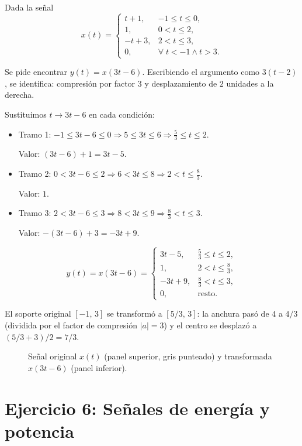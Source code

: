 \documentclass[10pt,a4paper]{article}
\begin{document}
	Dada la señal
	\[
	x(t)=
	\begin{cases}
	t+1, & -1\leq t\leq 0, \\
	1, & 0<t\leq 2, \\
	-t+3, & 2<t\leq 3, \\
	0, & \forall\; t<-1 \wedge t>3.
	\end{cases}
	\]
	
	Se pide encontrar $y(t) = x(3t-6)$. Escribiendo el argumento como $3(t-2)$, se identifica: compresión por factor $3$ y desplazamiento de $2$ unidades a la derecha.
	
	Sustituimos $t \to 3t-6$ en cada condición:
	\begin{itemize}
	    \item Tramo 1: $-1\leq 3t-6\leq 0 \Rightarrow 5\leq 3t\leq 6 \Rightarrow \frac{5}{3}\leq t\leq 2$.
	    
	    Valor: $(3t-6)+1 = 3t-5$.
	    \item Tramo 2: $0<3t-6\leq 2 \Rightarrow 6<3t\leq 8 \Rightarrow 2<t\leq \frac{8}{3}$.
	    
	    Valor: $1$.
	    \item Tramo 3: $2<3t-6\leq 3 \Rightarrow 8<3t\leq 9 \Rightarrow \frac{8}{3}<t\leq 3$.
	    
	    Valor: $-(3t-6)+3 = -3t+9$.
	\end{itemize}
	
	\[
	y(t) = x(3t-6) =
	\begin{cases}
	3t-5, & \frac{5}{3}\leq t\leq 2, \\[4pt]
	1, & 2<t\leq \frac{8}{3}, \\[4pt]
	-3t+9, & \frac{8}{3}<t\leq 3, \\[4pt]
	0, & \text{resto.}
	\end{cases}
	\]
	
	El soporte original $[-1,\, 3]$ se transformó a $[5/3,\, 3]$: la anchura pasó de $4$ a $4/3$ (dividida por el factor de compresión $|a|=3$) y el centro se desplazó a $(5/3+3)/2 = 7/3$.
	
	\begin{figure}[H]
		\centering
		
		\caption{Señal original $x(t)$ (panel superior, gris punteado) y transformada $x(3t-6)$ (panel inferior).}
		\label{fig:ejer6}
	\end{figure}

	\section*{Ejercicio 6: Señales de energía y potencia}
	
\end{document}
